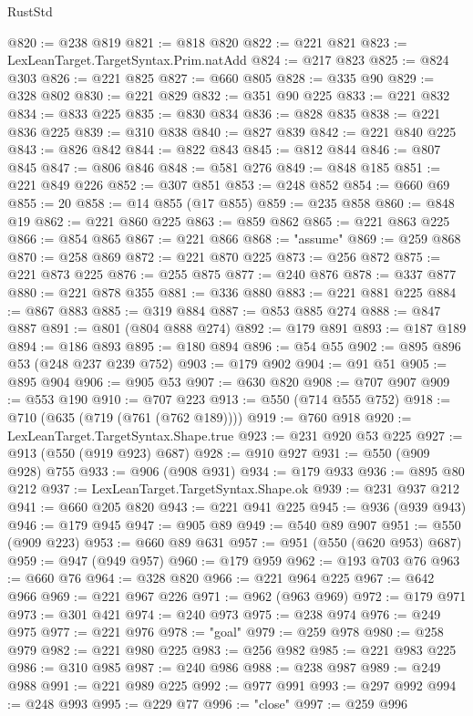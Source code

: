 \begin{lexlean}{RustStd}
\begin{coremodule}
@820 := @238 @819
@821 := @818 @820
@822 := @221 @821
@823 := LexLeanTarget.TargetSyntax.Prim.natAdd
@824 := @217 @823
@825 := @824 @303
@826 := @221 @825
@827 := @660 @805
@828 := @335 @90
@829 := @328 @802
@830 := @221 @829
@832 := @351 @90 @225
@833 := @221 @832
@834 := @833 @225
@835 := @830 @834
@836 := @828 @835
@838 := @221 @836 @225
@839 := @310 @838
@840 := @827 @839
@842 := @221 @840 @225
@843 := @826 @842
@844 := @822 @843
@845 := @812 @844
@846 := @807 @845
@847 := @806 @846
@848 := @581 @276
@849 := @848 @185
@851 := @221 @849 @226
@852 := @307 @851
@853 := @248 @852
@854 := @660 @69
@855 := 20
@858 := @14 @855 (@17 @855)
@859 := @235 @858
@860 := @848 @19
@862 := @221 @860 @225
@863 := @859 @862
@865 := @221 @863 @225
@866 := @854 @865
@867 := @221 @866
@868 := "assume"
@869 := @259 @868
@870 := @258 @869
@872 := @221 @870 @225
@873 := @256 @872
@875 := @221 @873 @225
@876 := @255 @875
@877 := @240 @876
@878 := @337 @877
@880 := @221 @878 @355
@881 := @336 @880
@883 := @221 @881 @225
@884 := @867 @883
@885 := @319 @884
@887 := @853 @885 @274
@888 := @847 @887
@891 := @801 (@804 @888 @274)
@892 := @179 @891
@893 := @187 @189
@894 := @186 @893
@895 := @180 @894
@896 := @54 @55
@902 := @895 @896 @53 (@248 @237 @239 @752)
@903 := @179 @902
@904 := @91 @51
@905 := @895 @904
@906 := @905 @53
@907 := @630 @820
@908 := @707 @907
@909 := @553 @190
@910 := @707 @223
@913 := @550 (@714 @555 @752)
@918 := @710 (@635 (@719 (@761 (@762 @189))))
@919 := @760 @918
@920 := LexLeanTarget.TargetSyntax.Shape.true
@923 := @231 @920 @53 @225
@927 := @913 (@550 (@919 @923) @687)
@928 := @910 @927
@931 := @550 (@909 @928) @755
@933 := @906 (@908 @931)
@934 := @179 @933
@936 := @895 @80 @212
@937 := LexLeanTarget.TargetSyntax.Shape.ok
@939 := @231 @937 @212
@941 := @660 @205 @820
@943 := @221 @941 @225
@945 := @936 (@939 @943)
@946 := @179 @945
@947 := @905 @89
@949 := @540 @89 @907
@951 := @550 (@909 @223)
@953 := @660 @89 @631
@957 := @951 (@550 (@620 @953) @687)
@959 := @947 (@949 @957)
@960 := @179 @959
@962 := @193 @703 @76
@963 := @660 @76
@964 := @328 @820
@966 := @221 @964 @225
@967 := @642 @966
@969 := @221 @967 @226
@971 := @962 (@963 @969)
@972 := @179 @971
@973 := @301 @421
@974 := @240 @973
@975 := @238 @974
@976 := @249 @975
@977 := @221 @976
@978 := "goal"
@979 := @259 @978
@980 := @258 @979
@982 := @221 @980 @225
@983 := @256 @982
@985 := @221 @983 @225
@986 := @310 @985
@987 := @240 @986
@988 := @238 @987
@989 := @249 @988
@991 := @221 @989 @225
@992 := @977 @991
@993 := @297 @992
@994 := @248 @993
@995 := @229 @77
@996 := "close"
@997 := @259 @996

\end{coremodule}
\end{lexlean}
